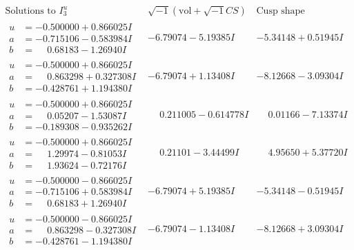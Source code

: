 \documentclass[1p]{elsarticle_modified}
\theoremstyle{definition}
\newcommand{\I}{\sqrt{-1}}
\begin{document}
$$\begin{array}{c|c|c}  
\text{Solutions to }I^u_{3}& \I (\text{vol} + \sqrt{-1}CS) & \text{Cusp shape}\\
 \hline 
\begin{aligned}
u &= -0.500000 + 0.866025 I \\
a &= -0.715106 - 0.583984 I \\
b &= \phantom{-}0.68183 - 1.26940 I\end{aligned}
 & -6.79074 - 5.19385 I & -5.34148 + 0.51945 I \\ \hline\begin{aligned}
u &= -0.500000 + 0.866025 I \\
a &= \phantom{-}0.863298 + 0.327308 I \\
b &= -0.428761 + 1.194380 I\end{aligned}
 & -6.79074 + 1.13408 I & -8.12668 - 3.09304 I \\ \hline\begin{aligned}
u &= -0.500000 + 0.866025 I \\
a &= \phantom{-}0.05207 - 1.53087 I \\
b &= -0.189308 - 0.935262 I\end{aligned}
 & \phantom{-}0.211005 - 0.614778 I & \phantom{-}0.01166 - 7.13374 I \\ \hline\begin{aligned}
u &= -0.500000 + 0.866025 I \\
a &= \phantom{-}1.29974 - 0.81053 I \\
b &= \phantom{-}1.93624 - 0.72176 I\end{aligned}
 & \phantom{-}0.21101 - 3.44499 I & \phantom{-}4.95650 + 5.37720 I \\ \hline\begin{aligned}
u &= -0.500000 - 0.866025 I \\
a &= -0.715106 + 0.583984 I \\
b &= \phantom{-}0.68183 + 1.26940 I\end{aligned}
 & -6.79074 + 5.19385 I & -5.34148 - 0.51945 I \\ \hline\begin{aligned}
u &= -0.500000 - 0.866025 I \\
a &= \phantom{-}0.863298 - 0.327308 I \\
b &= -0.428761 - 1.194380 I\end{aligned}
 & -6.79074 - 1.13408 I & -8.12668 + 3.09304 I \\ \hline\begin{aligned}

\end{aligned}
\end{array}$$
\end{document}
